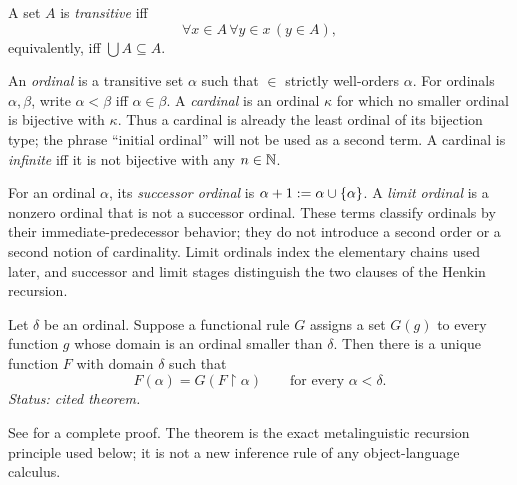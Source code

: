 \begin{definition}
\label{def:transitive-set}
A set \(A\) is \emph{transitive} iff
\[
  \forall x\in A\,\forall y\in x\,(y\in A),
\]
equivalently, iff \(\bigcup A\subseteq A\).
\end{definition}

\begin{definition}
\label{def:ordinal-cardinal}
An \emph{ordinal} is a transitive set \(\alpha\) such that \(\in\) strictly
well-orders \(\alpha\).  For ordinals \(\alpha,\beta\), write
\(\alpha<\beta\) iff \(\alpha\in\beta\).  A \emph{cardinal} is an ordinal
\(\kappa\) for which no smaller ordinal is bijective with \(\kappa\).  Thus a
cardinal is already the least ordinal of its bijection type; the phrase
``initial ordinal'' will not be used as a second term.  A cardinal is
\emph{infinite} iff it is not bijective with any \(n\in\mathbb{N}\).
\end{definition}

For an ordinal \(\alpha\), its \emph{successor ordinal} is
\(\alpha+1\mathrel{:=}\alpha\cup\{\alpha\}\).  A \emph{limit ordinal} is a nonzero
ordinal that is not a successor ordinal.  These terms classify ordinals by
their immediate-predecessor behavior; they do not introduce a second order or
a second notion of cardinality.  Limit ordinals index the elementary chains
used later, and successor and limit stages distinguish the two clauses of the
Henkin recursion.

\begin{theorem}
\label{thm:transfinite-recursion}
Let \(\delta\) be an ordinal.  Suppose a functional rule \(G\) assigns a set
\(G(g)\) to every function \(g\) whose domain is an ordinal smaller than
\(\delta\).  Then there is a unique function \(F\) with domain \(\delta\) such
that
\[
 F(\alpha)=G(F\mathbin{\upharpoonright}\alpha)
 \qquad\text{for every }\alpha<\delta.
\]
\textit{Status: cited theorem.}
\end{theorem}

See \cite{Jech2003} for a complete proof.  The theorem is the exact
metalinguistic recursion principle used below; it is not a new inference rule
of any object-language calculus.

